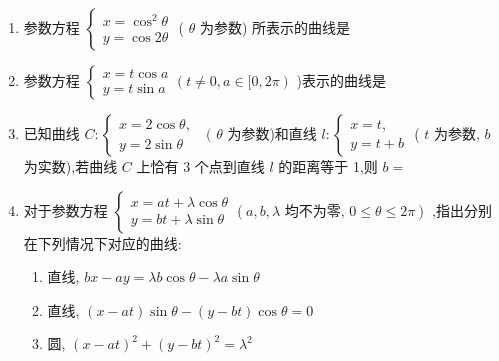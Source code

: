 \begin{enumerate}
    \item 参数方程 $\left\{  \begin{array}{l} x = {\cos }^{2}\theta \\  y = \cos {2\theta } \end{array}\right.$ ( $\theta$ 为参数) 所表示的曲线是
    
    \item 参数方程 $\left\{  {\begin{array}{l} x = t\cos a \\  y = t\sin a \end{array}\left( {t \neq  0,a \in  \lbrack 0,{2\pi }}\right) }\right.$ )表示的曲线是
    
    \item 已知曲线 $C : \left\{  {\begin{array}{l} x = 2\cos \theta , \\  y = 2\sin \theta  \end{array}\;\text{ ( }\theta }\right.$ 为参数)和直线 $l : \left\{  \begin{array}{l} x = t, \\  y = t + b \end{array}\right.$ ( $t$ 为参数, $b$ 为实数),若曲线 $C$ 上恰有 3 个点到直线 $l$ 的距离等于 1,则 $b =$ 
    
    \item 对于参数方程 $\left\{  {\begin{array}{l} x = {at} + \lambda \cos \theta \\  y = {bt} + \lambda \sin \theta  \end{array}\left( {a,b,\lambda \text{ 均不为零, }0 \leq  \theta  \leq  {2\pi }}\right) }\right.$ ,指出分别在下列情况下对应的曲线:
    \begin{jieda}
        \begin{enumerate}
            \item 直线, ${bx} - {ay} = {\lambda b}\cos \theta  - {\lambda a}\sin \theta$
            \item 直线, $\left( {x - {at}}\right) \sin \theta  - \left( {y - {bt}}\right) \cos \theta  = 0$
            \item 圆, ${\left( x - at\right) }^{2} + {\left( y - bt\right) }^{2} = {\lambda }^{2}$
        \end{enumerate}
    \end{jieda}
    

\end{enumerate}
